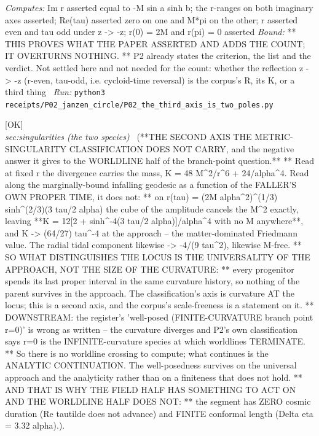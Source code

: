 \begin{description}
\emph{Computes:} Im r asserted equal to -M sin a sinh b; the r-ranges on both imaginary axes asserted; Re(tau) asserted zero on one and M*pi on the other; r asserted even and tau odd under z -> -z; r(0) = 2M and r(pi) = 0 asserted
 \emph{Bound:} ** THIS PROVES WHAT THE PAPER ASSERTED AND ADDS THE COUNT; IT OVERTURNS NOTHING. ** P2 already states the criterion, the list and the verdict. Not settled here and not needed for the count: whether the reflection z -> -z (r-even, tau-odd, i.e. cycloid-time reversal) is the corpus's R, its K, or a third thing
\ \emph{Run:} \texttt{python3 receipts/P02\_janzen\_circle/P02\_the\_third\_axis\_is\_two\_poles.py}
\item[\label{rcpt:P02_the_approach_is_mass_free}\texttt{P02\_the\_approach\_is\_mass\_free}]\hfill\textsf{[OK]}\\
\textit{sec:singularities (the two species)} \ (**THE SECOND AXIS THE METRIC-SINGULARITY CLASSIFICATION DOES NOT CARRY, and the negative answer it gives to the WORLDLINE half of the branch-point question.** ** Read at fixed r the divergence carries the mass, K = 48 M\textasciicircum{}2/r\textasciicircum{}6 + 24/alpha\textasciicircum{}4. Read along the marginally-bound infalling geodesic as a function of the FALLER'S OWN PROPER TIME, it does not: ** on r(tau) = (2M alpha\textasciicircum{}2)\textasciicircum{}(1/3) sinh\textasciicircum{}(2/3)(3 tau/2 alpha) the cube of the amplitude cancels the M\textasciicircum{}2 exactly, leaving **K = 12[2 + sinh\textasciicircum{}-4(3 tau/2 alpha)]/alpha\textasciicircum{}4 with no M anywhere**, and K -> (64/27) tau\textasciicircum{}-4 at the approach -- the matter-dominated Friedmann value. The radial tidal component likewise -> -4/(9 tau\textasciicircum{}2), likewise M-free. ** SO WHAT DISTINGUISHES THE LOCUS IS THE UNIVERSALITY OF THE APPROACH, NOT THE SIZE OF THE CURVATURE: ** every progenitor spends its last proper interval in the same curvature history, so nothing of the parent survives in the approach. The classification's axis is curvature AT the locus; this is a second axis, and the corpus's scale-freeness is a statement on it. ** DOWNSTREAM: the register's 'well-posed (FINITE-CURVATURE branch point r=0)' is wrong as written -- the curvature diverges and P2's own classification says r=0 is the INFINITE-curvature species at which worldlines TERMINATE. ** So there is no worldline crossing to compute; what continues is the ANALYTIC CONTINUATION. The well-posedness survives on the universal approach and the analyticity rather than on a finiteness that does not hold. ** AND THAT IS WHY THE FIELD HALF HAS SOMETHING TO ACT ON AND THE WORLDLINE HALF DOES NOT: ** the segment has ZERO cosmic duration (Re tautilde does not advance) and FINITE conformal length (\textbar{}Delta eta\textbar{} = 3.32 alpha).). 

\end{description}
